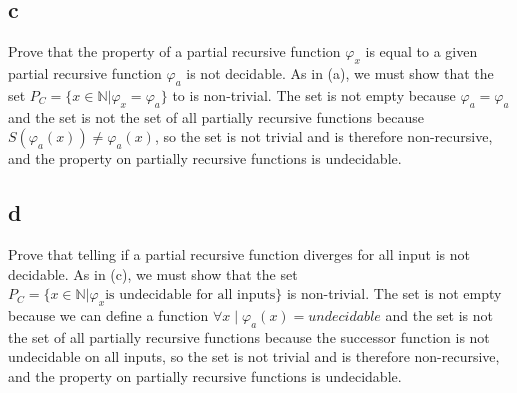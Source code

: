 \documentclass[12pt]{article}
\begin{document}
\subsection*{c} 
Prove that the property of a partial recursive function $\varphi_x$ is equal to a given partial recursive function $\varphi_a$ is not decidable.  As in (a), we must show that the set $P_C = \{x \in \mathbb{N} | \varphi_x = \varphi_a \}$ to is non-trivial.  The set is not empty because $\varphi_a = \varphi_a$ and the set is not the set of all partially recursive functions because $S (\varphi_a(x)) \neq \varphi_a(x)$, so the set is not trivial and is therefore non-recursive, and the property on partially recursive functions is undecidable.  
\subsection*{d}
Prove that telling if a partial recursive function diverges for all input is not decidable.  As in (c), we must show that the set $P_C = \{x \in \mathbb{N} | \varphi_x \text{is undecidable for all inputs} \}$ is non-trivial.  The set is not empty because we can define a function $\forall x \mid \varphi_a(x) = undecidable$ and the set is not the set of all partially recursive functions because the successor function is not undecidable on all inputs, so the set is not trivial and is therefore non-recursive, and the property on partially recursive functions is undecidable.  
\end{document}
